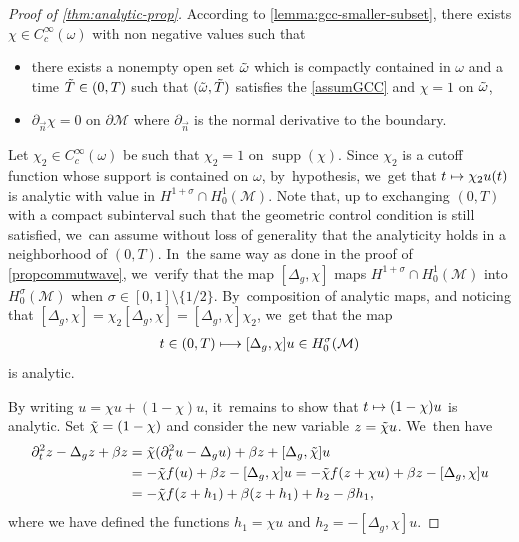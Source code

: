 \documentclass[JEP,XML,SOM,Unicode,published]{cedram}
\newcommand\mto{\mathchoice{\longmapsto}{\mapsto}{\mapsto}{\mapsto}}
\DeclareMathOperator{\supp}{\mathrm{supp}}
\theoremstyle{definition}
\let\mc\mathcal
\newcommand{\M}{\mc{M}}
\begin{document}
\begin{proof}[Proof of \cref{thm:analytic-prop}] According to \cref{lemma:gcc-smaller-subset}, there exists $\chi\in C^{\infty}_c(\omega)$ with non negative values such that
\begin{itemize}
\item there exists a nonempty open set $\Tilde{\omega}$ which is compactly contained in $\omega$ and a time $\Tilde T\in(0,T)$ such that $(\Tilde{\omega}, \Tilde{T})$ satisfies the \ref{assumGCC} and $\chi =1$ on $\Tilde{\omega}$,
\item $\partial_{\vec n} \chi=0$ on $\partial \M$ where $\partial_{\vec n}$ is the normal derivative to the boundary.
\end{itemize}

Let $\chi_2 \in C^{\infty}_c(\omega)$ be such that $\chi_2 =1$ on $\supp(\chi)$. Since $\chi_2$ is a cutoff function whose support is contained on $\omega$, by~hypothesis, we~get that $t\mto \chi_2u(t)$ is analytic with value in $ H^{1+\sigma}\cap H_0^1(\M)$. Note that, up to exchanging $(0,T)$ with a compact subinterval such that the geometric control condition is still satisfied, we~can assume without loss of generality that the analyticity holds in a neighborhood of $(0,T)$. In~the same way as done in the proof of \cref{propcommutwave}, we~verify that the map $[\Delta_g, \chi]$ maps $ H^{1+\sigma}\cap H_0^1(\M)$ into $H^{\sigma}_0(\M)$ when $\sigma\in [0, 1]\setminus \{1/2\}$. By~composition of analytic maps, and noticing that $[\Delta_g, \chi]=\chi_2[\Delta_g, \chi]=[\Delta_g, \chi]\chi_2$, we~get that the map\vspace*{-3pt}
\begin{align*}
t\in (0, T)\mto [\Delta_g, \chi] u\in H_0^{\sigma}(\M)
\end{align*}
is analytic.

By writing $u=\chi u+(1-\chi)u$, it~remains to show that $t\mto (1-\chi)u$ is analytic. Set $\Tilde{\chi}=(1-\chi)$ and consider the new variable $z=\Tilde{\chi} u$. We~then have\vspace*{-3pt}
\begin{align*}
\partial_t^2 z-\Delta_g z+\beta z&=\Tilde{\chi}(\partial_t^2 u-\Delta_g u)+\beta z+[\Delta_g, \Tilde{\chi}]u\\
&=-\Tilde{\chi} f(u)+\beta z-[\Delta_g, \chi]u=-\Tilde{\chi} f(z+\chi u)+\beta z-[\Delta_g, \chi]u\\
&=-\Tilde{\chi} f(z+h_1)+\beta (z+h_1)+h_2-\beta h_1,
\end{align*}
where we have defined the functions $h_1=\chi u$ and $h_2=-[\Delta_g, \chi]u$.


\end{proof}
\end{document}
